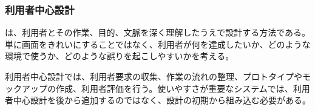 \subsubsection{利用者中心設計}

 は、利用者とその作業、目的、文脈を深く理解したうえで設計する方法である。単に画面をきれいにすることではなく、利用者が何を達成したいか、どのような環境で使うか、どのような誤りを起こしやすいかを考える。

利用者中心設計では、利用者要求の収集、作業の流れの整理、プロトタイプやモックアップの作成、利用者評価を行う。使いやすさが重要なシステムでは、利用者中心設計を後から追加するのではなく、設計の初期から組み込む必要がある。
